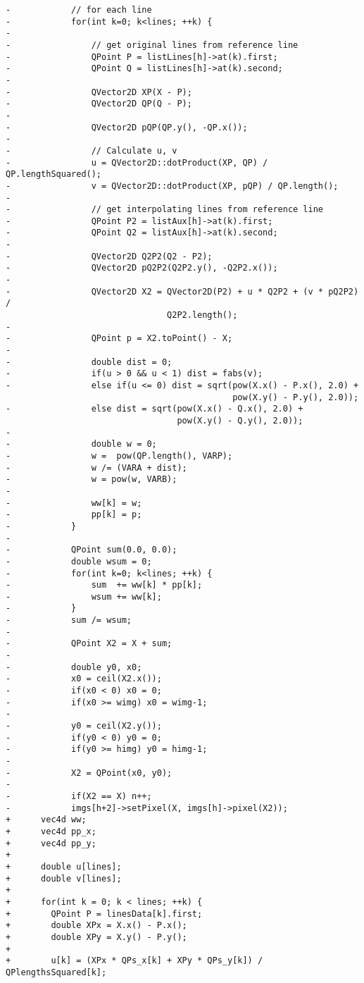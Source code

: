 \documentclass[12pt]{article}
\begin{document}
\begin{lstlisting}
-            // for each line
-            for(int k=0; k<lines; ++k) {
-                
-                // get original lines from reference line
-                QPoint P = listLines[h]->at(k).first;
-                QPoint Q = listLines[h]->at(k).second;
-                
-                QVector2D XP(X - P);
-                QVector2D QP(Q - P);
-                
-                QVector2D pQP(QP.y(), -QP.x());
-                
-                // Calculate u, v
-                u = QVector2D::dotProduct(XP, QP) /  QP.lengthSquared();
-                v = QVector2D::dotProduct(XP, pQP) / QP.length();
-
-                // get interpolating lines from reference line
-                QPoint P2 = listAux[h]->at(k).first;
-                QPoint Q2 = listAux[h]->at(k).second;
-
-                QVector2D Q2P2(Q2 - P2);
-                QVector2D pQ2P2(Q2P2.y(), -Q2P2.x());
-
-                QVector2D X2 = QVector2D(P2) + u * Q2P2 + (v * pQ2P2) /
                                Q2P2.length();
-
-                QPoint p = X2.toPoint() - X;
-
-                double dist = 0;
-                if(u > 0 && u < 1) dist = fabs(v);
-                else if(u <= 0) dist = sqrt(pow(X.x() - P.x(), 2.0) + 
                                             pow(X.y() - P.y(), 2.0));
-                else dist = sqrt(pow(X.x() - Q.x(), 2.0) +
                                  pow(X.y() - Q.y(), 2.0));
-
-                double w = 0;
-                w =  pow(QP.length(), VARP);
-                w /= (VARA + dist);
-                w = pow(w, VARB);
-
-                ww[k] = w;
-                pp[k] = p;
-            }
-
-            QPoint sum(0.0, 0.0);
-            double wsum = 0;
-            for(int k=0; k<lines; ++k) {
-                sum  += ww[k] * pp[k];
-                wsum += ww[k];
-            }
-            sum /= wsum;
-
-            QPoint X2 = X + sum;
-
-            double y0, x0;
-            x0 = ceil(X2.x());
-            if(x0 < 0) x0 = 0;
-            if(x0 >= wimg) x0 = wimg-1;
-
-            y0 = ceil(X2.y());
-            if(y0 < 0) y0 = 0;
-            if(y0 >= himg) y0 = himg-1;
-
-            X2 = QPoint(x0, y0);
-
-            if(X2 == X) n++;
-            imgs[h+2]->setPixel(X, imgs[h]->pixel(X2));
+      vec4d ww;
+      vec4d pp_x;
+      vec4d pp_y;
+      
+      double u[lines];
+      double v[lines];
+
+      for(int k = 0; k < lines; ++k) {
+        QPoint P = linesData[k].first;
+        double XPx = X.x() - P.x();
+        double XPy = X.y() - P.y();
+
+        u[k] = (XPx * QPs_x[k] + XPy * QPs_y[k]) / QPlengthsSquared[k];

\end{lstlisting}
\end{document}
